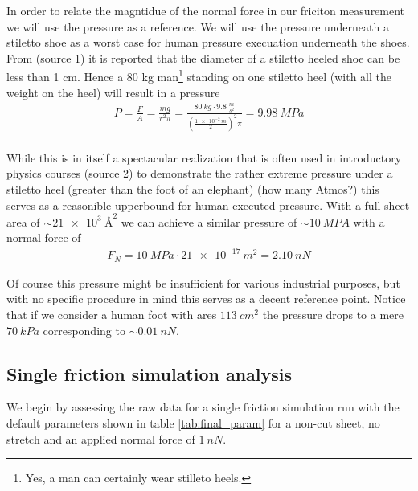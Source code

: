 In order to relate the magntidue of the normal force in our friciton measurement
we will use the pressure as a reference. We will use the pressure underneath a
stiletto shoe as a worst case for human pressure execuation underneath the
shoes. From (source 1) it is reported that the diameter of a stiletto heeled
shoe can be less than 1 cm. Hence a 80 kg man\footnote{Yes, a man can certainly
wear stilleto heels.} standing on one stiletto heel (with all the weight on the
heel) will result in a pressure
\begin{align*}
  P = \frac{F}{A} = \frac{mg}{r^2\pi} = \frac{\SI{80}{kg} \cdot \SI{9.8}{\frac{m}{s^2}}}{(\frac{\SI{1e-2}{m}}{2})^2 \pi} = \SI{9.98}{MPa} \\
\end{align*} 

While this is in itself a spectacular realization that is often used in
introductory physics courses (source 2) to demonstrate the rather extreme
pressure under a stiletto heel (greater than the foot of an elephant) (how many
Atmos?) this serves as a reasonible upperbound for human executed pressure. With
a full sheet area of $\sim\SI{21e3}{{\text{Å}}^2}$ we can achieve a similar pressure of
$\sim \SI{10}{MPA}$ with a normal force of
\begin{align*}
  F_N = \SI{10}{MPa} \cdot \SI{21e-17}{m^2} = \SI{2.10}{nN}  
\end{align*}

Of course this pressure might be insufficient for various industrial purposes,
but with no specific procedure in mind this serves as a decent reference point.
Notice that if we consider a human foot with ares $\SI{113}{cm^2}$ the pressure
drops to a mere $\SI{70}{kPa}$ corresponding to $\sim \SI{0.01}{nN}$.





\newpage
\subsection{Single friction simulation analysis}\label{sec:single_analysis}
We begin by assessing the raw data for a single friction simulation run with the default parameters shown in table \ref{tab:final_param} for a non-cut sheet, no stretch and an applied normal force of $\SI{1}{nN}$.


